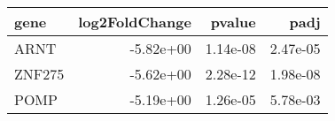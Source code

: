 \begin{tabular}{lrrr}
\toprule
  gene &  log2FoldChange &   pvalue &     padj \\
\midrule
  ARNT &       -5.82e+00 & 1.14e-08 & 2.47e-05 \\
ZNF275 &       -5.62e+00 & 2.28e-12 & 1.98e-08 \\
  POMP &       -5.19e+00 & 1.26e-05 & 5.78e-03 \\
\bottomrule
\end{tabular}
